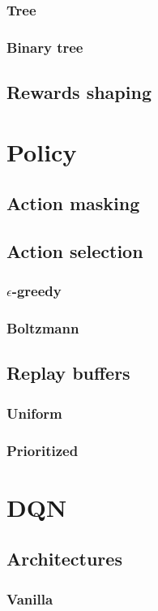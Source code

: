\documentclass[a4paper,10pt]{report}
\begin{document}
\subsection{Tree}
\subsection{Binary tree}
\section{Rewards shaping}

\chapter{Policy}
\section{Action masking}
\section{Action selection}
\subsection{$\epsilon$-greedy}
\subsection{Boltzmann}
\section{Replay buffers}
\subsection{Uniform}
\subsection{Prioritized}

\chapter{DQN}
\section{Architectures}
\subsection{Vanilla}
\end{document}
